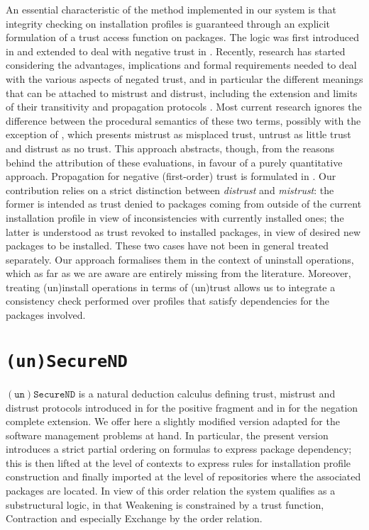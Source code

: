 \documentclass[]{llncs}
\begin{document}
An essential characteristic of the method implemented in our system is that integrity checking on installation profiles is guaranteed through an explicit formulation of a trust access function on packages. The logic was first introduced in \cite{primiero_secureND} and extended to deal with negative trust in \cite{DBLP:conf/ifiptm/Primiero16}.  Recently, research has started considering the advantages, implications and formal requirements needed to deal with the various aspects of negated trust, and in particular the different meanings that can be attached to mistrust and distrust, including the extension and limits of  their transitivity and propagation protocols \cite{DBLP:conf/agents/McKnightC00,DBLP:conf/www/GuhaKRT04,marsh05,Ziegler:2005:PMT:1108451.1108466}. Most current research ignores the difference between the procedural semantics of these two terms, possibly with the exception of \cite{marsh05}, which presents mistrust as misplaced trust, untrust as little trust and distrust as no trust. This approach abstracts, though, from the reasons behind the attribution of these evaluations, in favour of a purely quantitative approach. Propagation for negative (first-order) trust is formulated in \cite{DBLP:conf/apccm/JosangP05}. Our contribution relies on a strict distinction between \textit{distrust} and \textit{mistrust}: the former is intended as trust denied to packages coming from outside of the current installation profile in view of inconsistencies with currently installed ones; the latter is understood as trust revoked to installed packages, in view of desired new packages to be installed. These two cases have not been in general treated separately. Our approach formalises them in the context of uninstall operations, which as far as we are aware are entirely missing from the literature. Moreover, treating (un)install operations in terms of (un)trust allows us to integrate a consistency check performed over profiles that satisfy dependencies for the packages involved.

\section{\texttt{(un)SecureND}}\label{sec:logic}

$\mathtt{(un)SecureND}$ is a natural deduction calculus defining trust, mistrust and distrust protocols introduced in \cite{primiero_secureND} for the positive fragment  and in \cite{DBLP:conf/ifiptm/Primiero16} for the negation complete extension. We offer here a slightly modified version adapted for the software management problems at hand. In particular, the present version introduces a strict partial ordering on formulas to express package dependency; this is then lifted at the level of contexts to express rules for installation profile construction and finally imported at the level of repositories where the associated packages are located. In view of this order relation the system qualifies as a substructural logic, in that Weakening is constrained by a trust function, Contraction and especially Exchange by the order relation.
\end{document}
